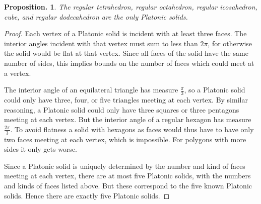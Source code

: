 \documentclass[12pt]{article}
\newtheorem*{proposition*}{Proposition.}
\begin{document}
\begin{proposition*}
The regular tetrahedron, regular octahedron, regular icosahedron, cube, and regular dodecahedron
are the only Platonic solids.
\end{proposition*}

\begin{proof}
Each vertex of a Platonic solid is incident with at least three 
faces.  The interior angles incident with that vertex must sum to
less than $2\pi$, for otherwise the solid would be flat at that 
vertex.  Since all faces of the solid have the same number of sides,
this implies bounds on the number of faces which could meet at a 
vertex.

The interior angle of an equilateral triangle has measure $\frac{\pi}{3}$,
so a Platonic solid could only have three, four, or five triangles
meeting at each vertex.  By similar reasoning, a Platonic solid could
only have three squares or three pentagons meeting at each vertex.  But 
the interior angle of a regular hexagon has measure $\frac{2\pi}{3}$.  
To avoid flatness a solid with hexagons as faces would thus have
to have only two faces meeting at each vertex, which is impossible.  For
polygons with more sides it only gets worse.  

Since a Platonic solid is uniquely determined by the number and kind of 
faces meeting at each vertex, there are at most five Platonic solids, 
with the numbers and kinds of faces listed above.  But
these correspond to the five known Platonic solids.  Hence there are
exactly five Platonic solids.
\end{proof}
\end{document}
